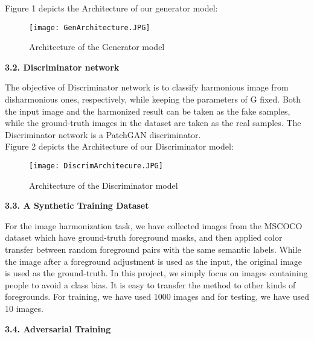 \documentclass{article}
\begin{document}
Figure 1 depicts the Architecture of our generator model:

\begin{figure}[htp]
    \centering
    \Large\texttt{[image: GenArchitecture.JPG]}
    \caption{Architecture of the Generator model}
    \label{fig:GenArchitecture}
\end{figure}

\begin{flushleft}
\textbf{3.2. Discriminator network}
\end{flushleft}

The objective of Discriminator network is to classify harmonious image from disharmonious ones, respectively, while keeping the parameters of G fixed. Both the input image and the harmonized result can be taken as the fake samples, while the ground-truth images in the dataset are taken as the real samples. The Discriminator network is a PatchGAN discriminator.\\

Figure 2 depicts the Architecture of our Discriminator model:\\

\begin{figure}[htp]
    \centering
    \Large\texttt{[image: DiscrimArchitecure.JPG]}
    \caption{Architecture of the Discriminator model}
    \label{fig:DiscrimArchitecture}
\end{figure}

\begin{center}
\end{center}

\begin{flushleft}
\textbf{3.3. A Synthetic Training Dataset}
\end{flushleft}

For the image harmonization task, we have collected images from the MSCOCO dataset which have ground-truth foreground masks, and then applied color transfer between random foreground pairs with the same semantic labels. While the image after a foreground adjustment is used as the input, the original image is used as the ground-truth. 
In this project, we simply focus on images containing people to avoid a class bias. It is easy to transfer the method to other kinds of foregrounds. For training, we have used 1000 images and for testing, we have used 10 images.\\

\begin{flushleft}
\textbf{3.4. Adversarial Training}
\end{flushleft}
\end{document}
